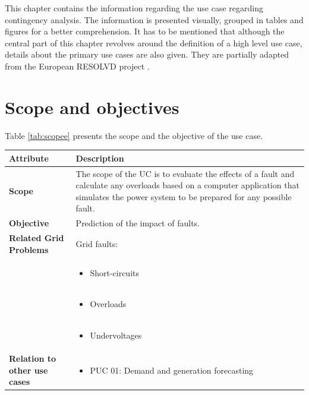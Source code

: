 This chapter contains the information regarding the use case regarding contingency analysis. The information is presented visually, grouped in tables and figures for a better comprehension. It has to be mentioned that although the central part of this chapter revolves around the definition of a high level use case, details about the primary use cases are also given. They are partially adapted from the European RESOLVD project \cite{melendez2019resolvd}.

\section{Scope and objectives}
Table \ref{tab:scopee} presents the scope and the objective of the use case.

\begin{table}[!htb]\centering
  \renewcommand{\arraystretch}{1.6}
    \centering
\begin{tabularx}{\linewidth}{|l|L|} 
    \hline
\textbf{Attribute} & \textbf{Description}\\ 
    \hline
\textbf{Scope} & The scope of the UC is to evaluate the effects of a fault and calculate any overloads based on a computer application that simulates the power system to be prepared for any possible fault. \\
\hline
\textbf{Objective} & Prediction of the impact of faults. \\
\hline
\textbf{Related Grid Problems} & Grid faults: \\
                               & \vspace{-0.25cm} \begin{itemize} \item Short-circuits \end{itemize} \\
                               & \vspace{-0.75cm} \begin{itemize} \item Overloads \end{itemize} \\
                               & \vspace{-0.75cm} \begin{itemize} \item Undervoltages \end{itemize} \\
    \hline
\textbf{Relation to other use cases} & \begin{itemize} \item PUC 01: Demand and generation forecasting \end{itemize} \\

\end{tabularx}
\end{table}
